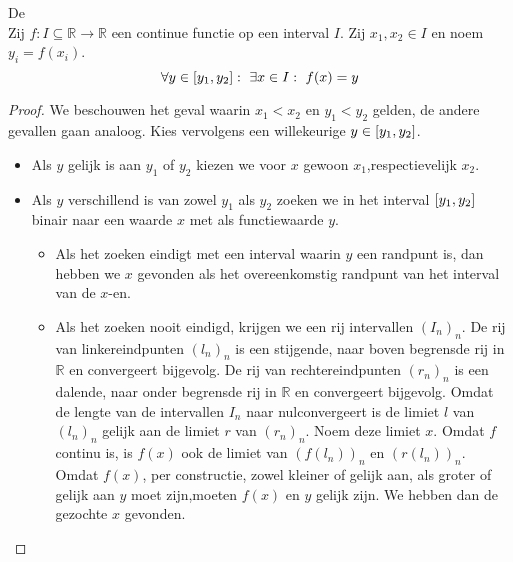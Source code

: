 \documentclass[main.tex]{subfiles}
\begin{document}
\begin{bst}
  \label{st:tussenwaardestelling}
  De \\
  Zij $f: I \subseteq \mathbb{R} \rightarrow \mathbb{R}$ een continue functie op een interval $I$.
  Zij $x_{1},x_{2}\in I$ en noem $y_{i}=f(x_{i})$.
  \[ \forall y \in \interval{y_{1}}{y_{2}}:\ \exists x \in I:\ f(x) = y \]

  \begin{proof}
    We beschouwen het geval waarin $x_{1}<x_{2}$ en $y_{1}<y_{2}$ gelden, de andere gevallen gaan analoog.
    Kies vervolgens een willekeurige $y\in \interval{y_{1}}{y_{2}}$.
    \begin{itemize}
    \item Als $y$ gelijk is aan $y_{1}$ of $y_{2}$ kiezen we voor $x$ gewoon $x_{1}$,respectievelijk $x_{2}$.
    \item Als $y$ verschillend is van zowel $y_{1}$ als $y_{2}$ zoeken we in het interval $\interval{y_{1}}{y_{2}}$ binair naar een waarde $x$ met als functiewaarde $y$.
      \begin{itemize}
      \item Als het zoeken eindigt met een interval waarin $y$ een randpunt is, dan hebben we $x$ gevonden als het overeenkomstig randpunt van het interval van de $x$-en.
      \item Als het zoeken nooit eindigd, krijgen we een rij intervallen $(I_{n})_{n}$.
        De rij van linkereindpunten $(l_{n})_{n}$ is een stijgende, naar boven begrensde rij in $\mathbb{R}$ en convergeert bijgevolg.
        De rij van rechtereindpunten $(r_{n})_{n}$ is een dalende, naar onder begrensde rij in $\mathbb{R}$ en convergeert bijgevolg.
        Omdat de lengte van de intervallen $I_{n}$ naar nulconvergeert is de limiet $l$ van $(l_{n})_{n}$ gelijk aan de limiet $r$ van $(r_{n})_{n}$.
        Noem deze limiet $x$.
        Omdat $f$ continu is, is $f(x)$ ook de limiet van $(f(l_{n}))_{n}$ en $(r(l_{n}))_{n}$.
        Omdat $f(x)$, per constructie, zowel kleiner of gelijk aan, als groter of gelijk aan $y$ moet zijn,\waarom moeten $f(x)$ en $y$ gelijk zijn.
        We hebben dan de gezochte $x$ gevonden.
      \end{itemize}
    \end{itemize}
  \end{proof}
\end{bst}
\end{document}
